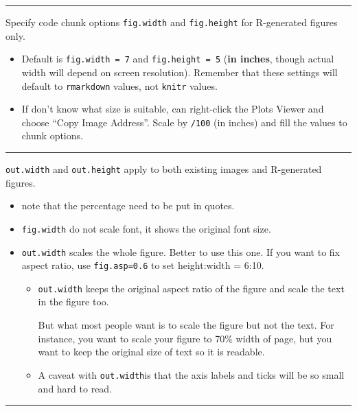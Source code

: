 \documentclass[
  a4paper,
  twoside,
  openright]{book}
\providecommand{\tightlist}{%
  \setlength{\itemsep}{0pt}\setlength{\parskip}{0pt}}
\theoremstyle{definition}
\theoremstyle{definition}
\theoremstyle{definition}
\theoremstyle{definition}
\theoremstyle{remark}
\begin{document}
\begin{center}\rule{0.5\linewidth}{0.5pt}\end{center}

Specify code chunk options \texttt{fig.width} and \texttt{fig.height} for R-generated figures only.

\begin{itemize}
\tightlist
\item
  Default is \texttt{fig.width\ =\ 7} and \texttt{fig.height\ =\ 5} (\textbf{in inches}, though actual width will depend on screen resolution). Remember that these settings will default to \texttt{rmarkdown} values, not \texttt{knitr} values.
\item
  If don't know what size is suitable, can right-click the Plots Viewer and choose ``Copy Image Address''. Scale by \texttt{/100} (in inches) and fill the values to chunk options.
\end{itemize}

\begin{center}\rule{0.5\linewidth}{0.5pt}\end{center}

\texttt{out.width} and \texttt{out.height} apply to both existing images and R-generated figures.

\begin{itemize}
\item
  note that the percentage need to be put in quotes.
\item
  \texttt{fig.width} do not scale font, it shows the original font size.
\item
  \texttt{out.width} scales the whole figure. Better to use this one. If you want to fix aspect ratio, use \texttt{fig.asp=0.6} to set height:width = 6:10.

  \begin{itemize}
  \item
    \texttt{out.width} keeps the original aspect ratio of the figure and scale the text in the figure too.

    But what most people want is to scale the figure but not the text. For instance, you want to scale your figure to 70\% width of page, but you want to keep the original size of text so it is readable.
  \item
    A caveat with \texttt{out.width}is that the {axis labels and ticks will be so small} and hard to read.
  \end{itemize}
\end{itemize}

\begin{center}\rule{0.5\linewidth}{0.5pt}\end{center}
\end{document}
